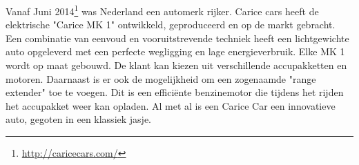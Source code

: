 Vanaf Juni 2014\footnote{\url{http://caricecars.com/}} was Nederland een automerk rijker. Carice cars heeft de elektrische "Carice MK 1" ontwikkeld, geproduceerd en op de markt gebracht. 
Een combinatie van eenvoud en vooruitstrevende techniek heeft een lichtgewichte auto opgeleverd met een perfecte wegligging en lage energieverbruik. 
\newline
Elke MK 1 wordt op maat gebouwd. De klant kan kiezen uit verschillende accupakketten en motoren. Daarnaast is er ook de mogelijkheid om een zogenaamde "range extender" toe te voegen. Dit is een efficiënte benzinemotor die tijdens het rijden het accupakket weer kan opladen. 
\newline
Al met al is een Carice Car een innovatieve auto, gegoten in een klassiek jasje.